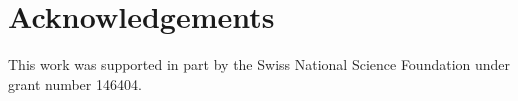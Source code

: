 \section*{Acknowledgements}

This work was supported in part by the Swiss National Science Foundation under grant number 146404.